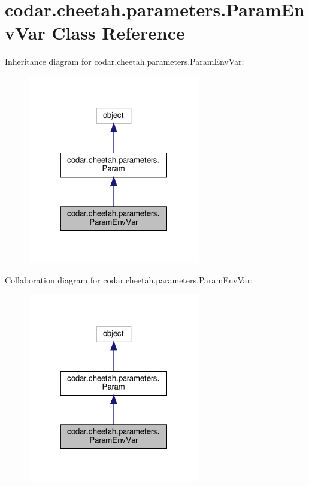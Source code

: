 \hypertarget{classcodar_1_1cheetah_1_1parameters_1_1_param_env_var}{}\section{codar.\+cheetah.\+parameters.\+Param\+Env\+Var Class Reference}
\label{classcodar_1_1cheetah_1_1parameters_1_1_param_env_var}


Inheritance diagram for codar.\+cheetah.\+parameters.\+Param\+Env\+Var\+:
\nopagebreak
\begin{figure}[H]
\begin{center}
\leavevmode
\includegraphics[width=213pt]{classcodar_1_1cheetah_1_1parameters_1_1_param_env_var__inherit__graph}
\end{center}
\end{figure}


Collaboration diagram for codar.\+cheetah.\+parameters.\+Param\+Env\+Var\+:
\nopagebreak
\begin{figure}[H]
\begin{center}
\leavevmode
\includegraphics[width=213pt]{classcodar_1_1cheetah_1_1parameters_1_1_param_env_var__coll__graph}
\end{center}
\end{figure}
